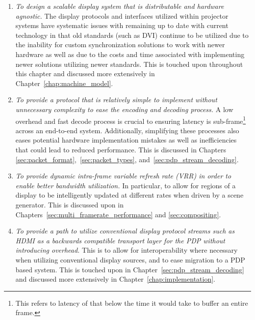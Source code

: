     \begin{enumerate}
        \item {\em To design a scalable display system that is distributable and hardware agnostic.} The display protocols and interfaces utilized within projector systems have systematic issues with remaining up to date with current technology in that old standards (such as DVI) continue to be utilized due to the inability for custom synchronization solutions to work with newer hardware as well as due to the costs and time associated with implementing newer solutions utilizing newer standards. This is touched upon throughout this chapter and discussed more extensively in Chapter~\ref{chap:machine_model}.
        \item {\em To provide a protocol that is relatively simple to implement without unnecessary complexity to ease the encoding and decoding process.} A low overhead and fast decode process is crucial to ensuring latency is sub-frame\footnote{This refers to latency of that below the time it would take to buffer an entire frame.} across an end-to-end system. Additionally, simplifying these processes also eases potential hardware implementation mistakes as well as inefficiencies that could lead to reduced performance. This is discussed in Chapters~ \ref{sec:packet_format},~\ref{sec:packet_types}, and~\ref{sec:pdp_stream_decoding}.
        \item {\em To provide dynamic intra-frame variable refresh rate (VRR) in order to enable better bandwidth utilization.} In particular, to allow for regions of a display to be intelligently updated at different rates when driven by a scene generator. This is discussed upon in Chapters~\ref{sec:multi_framerate_performance} and \ref{sec:compositing}.
        \item {\em To provide a path to utilize conventional display protocol streams such as HDMI as a backwards compatible transport layer for the PDP without introducing overhead.} This is to allow for interoperability where necessary when utilizing conventional display sources, and to ease migration to a PDP based system. This is touched upon in Chapter~\ref{sec:pdp_stream_decoding} and discussed more extensively in Chapter~\ref{chap:implementation}.
    \end{enumerate}

